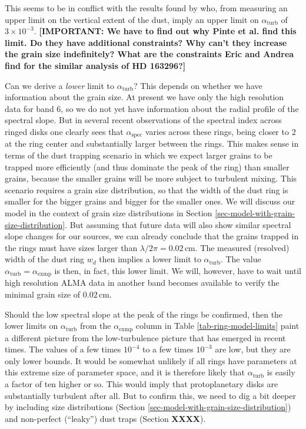 \documentclass{aa}
\begin{document}
This seems to be in conflict with the results found by
\citet{2016ApJ...816...25P} who, from measuring an upper limit on the vertical
extent of the dust, imply an upper limit on $\alpha_{\mathrm{turb}}$ of $3\times
10^{-3}$. {\bf [IMPORTANT: We have to find out why Pinte et al. find this
    limit. Do they have additional constraints? Why can't they increase the grain
    size indefinitely? What are the constraints Eric and Andrea find for the
similar analysis of HD 163296?]}

Can we derive a {\em lower} limit to $\alpha_{\mathrm{turb}}$? This depends on
whether we have information about the grain size. At present we have only the
high resolution data for band 6, so we do not yet have information about the
radial profile of the spectral slope. But in several recent observations of the
spectral index across ringed disks
\citep{2015ApJ...808L...3A,2018ApJ...852..122H} one clearly sees that
$\alpha_{\mathrm{spec}}$ varies across these rings, being closer to $2$ at the
ring center and substantially larger between the rings. This makes sense in
terms of the dust trapping scenario in which we expect larger grains to be
trapped more efficiently (and thus dominate the peak of the ring) than smaller
grains, because the smaller grains will be more subject to turbulent
mixing. This scenario requires a grain size distribution, so that the width of
the dust ring is smaller for the bigger grains and bigger for the smaller ones.
We will discuss our model in the context of grain size distributions in Section
\ref{sec-model-with-grain-size-distribution}. But assuming that future data will
also show similar spectral slope changes for our sources, we can already
conclude that the grains trapped in the rings must have sizes larger than
$\lambda/2\pi=0.02\,\mathrm{cm}$. The measured (resolved) width of the dust ring
$w_d$ then implies a lower limit to $\alpha_{\mathrm{turb}}$. The value
$\alpha_{\mathrm{turb}}=\alpha_{\mathrm{exmp}}$ is then, in fact, this lower
limit. We will, however, have to wait until high resolution ALMA data in another
band becomes available to verify the minimal grain size of $0.02\,\mathrm{cm}$.

Should the low spectral slope at the peak of the rings be confirmed, then the
lower limits on $\alpha_{\mathrm{turb}}$ from the $\alpha_{\mathrm{exmp}}$
column in Table \ref{tab-ring-model-limits} paint a different picture from the
low-turbulence picture that has emerged in recent times. The values of a few
times $10^{-4}$ to a few times $10^{-3}$ are low, but they are only lower
bounds. It would be somewhat unlikely if all rings have parameters at this
extreme size of parameter space, and it is therefore likely that
$\alpha_{\mathrm{turb}}$ is easily a factor of ten higher or so. This would
imply that protoplanetary disks are substantially turbulent after all. But to
confirm this, we need to dig a bit deeper by including size distributions
(Section \ref{sec-model-with-grain-size-distribution}) and non-perfect
(``leaky'') dust traps (Section {\bf XXXX}).
\end{document}
